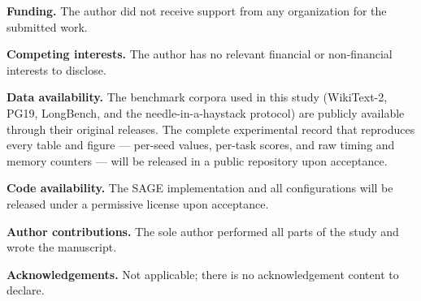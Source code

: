 \documentclass[11pt,a4paper]{article}
\begin{document}
\noindent\textbf{Funding.} The author did not receive support from any
organization for the submitted work.

\vspace{0.5em}

\noindent\textbf{Competing interests.} The author has no relevant
financial or non-financial interests to disclose.

\vspace{0.5em}

\noindent\textbf{Data availability.} The benchmark corpora used in this
study (WikiText-2, PG19, LongBench, and the needle-in-a-haystack
protocol) are publicly available through their original releases. The
complete experimental record that reproduces every table and figure ---
per-seed values, per-task scores, and raw timing and memory counters ---
will be released in a public repository upon acceptance.

\vspace{0.5em}

\noindent\textbf{Code availability.} The SAGE implementation and all
configurations will be released under a permissive license upon
acceptance.

\vspace{0.5em}

\noindent\textbf{Author contributions.} The sole author performed all
parts of the study and wrote the manuscript.

\vspace{0.5em}

\noindent\textbf{Acknowledgements.} Not applicable; there is no
acknowledgement content to declare.
\end{document}
